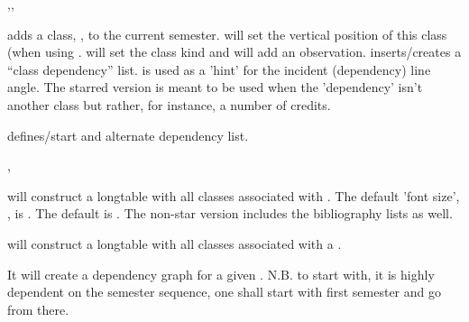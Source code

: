 \documentclass[article,nofontwarning,nogeometry,english,tocdepth=3,secdepth=3]{ufrgscca} %
\begin{document}
\begin{codedescribe}[code,update=2023/11/18]{\addclass,\depdef,\altdep}
    \begin{codesyntax}%
        \tsobj[code]{\addclass}
        \tsobj[code]{\depdef}\tsverb[oarg]{*}
        \tsmacro{\altdep}{}
    \end{codesyntax}
\tsmacro{\addclass}{} adds a class, , to the current semester.  will set the vertical position of this class (when using \tsobj{\GraphEtp}.  will set the class kind and  will add an observation.
\tsmacro{\depdef}{} inserts/creates a “class dependency” list.  is used as a 'hint' for the incident (dependency) line angle. The starred version is meant to be used when the 'dependency' isn't another class but rather, for instance, a number of credits.

\tsmacro{\altdep}{} defines/start and alternate dependency list.
\end{codedescribe}


\begin{codedescribe}[code,update=2023/11/18]{\TabEtp,\TabTopic}
    \begin{codesyntax}%
        \tsobj[code]{\TabEtp}\tsverb[oarg]{*}
    \end{codesyntax}
\tsmacro{\TabEtp}{} will construct a longtable with all classes associated with . The default 'font size', , is \tsobj{\footnotesize}.
The default  is \tsobj{\notoc\section}.
The non-star version includes the bibliography lists as well.

\tsmacro{\TabTopic}{} will construct a longtable with all classes associated with a .

\end{codedescribe}


\begin{codedescribe}[code,update=2023/11/18]{\GraphEtp}
    \begin{codesyntax}%
    \end{codesyntax}
It will create a dependency graph for a given . N.B. to start with, it is highly dependent on the semester sequence, one shall start with first semester and go from there.
\end{codedescribe}

\fi
\end{document}
